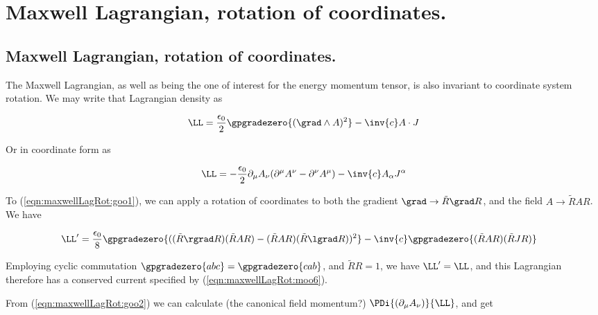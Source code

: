 %

\chapter{Maxwell Lagrangian, rotation of coordinates.}
\label{chap:maxwellLagRot}
{}
\date{Sept 5, 2009}

\beginArtNoToc

\section{Maxwell Lagrangian, rotation of coordinates.}

The Maxwell Lagrangian, as well as being the one of interest for the energy momentum tensor, is also invariant to coordinate system rotation.  We may write that Lagrangian density as

\begin{align}\label{eqn:maxwellLagRot:goo1}
\LL = \frac{\epsilon_0}{2} \gpgradezero{(\grad \wedge A)^2} - \inv{c} A \cdot J
\end{align}

Or in coordinate form as

\begin{align}\label{eqn:maxwellLagRot:goo2}
\LL = -\frac{\epsilon_0}{2} \partial_\mu A_\nu (\partial^\mu A^\nu - \partial^\nu A^\mu) - \inv{c} A_\alpha J^\alpha
\end{align}

To (\ref{eqn:maxwellLagRot:goo1}), we can apply a rotation of coordinates to both the gradient $\grad \rightarrow \tilde{R} \grad R$, and the field $A \rightarrow \tilde{R} A R$.  We have

\begin{align}\label{eqn:maxwellLagRot:goo3}
\LL' &= \frac{\epsilon_0}{8} \gpgradezero{((\tilde{R} \rgrad R) (\tilde{R} A R) - (\tilde{R} A R) (\tilde{R} \lgrad R))^2} - \inv{c} \gpgradezero{ (\tilde{R} A R) (\tilde{R} J R)}
\end{align}

Employing cyclic commutation $\gpgradezero{ a b c} = \gpgradezero{ c a b }$, and $\tilde{R} R = 1$, we have $\LL' = \LL$, and this Lagrangian therefore has a conserved current specified by (\ref{eqn:maxwellLagRot:moo6}).

From (\ref{eqn:maxwellLagRot:goo2}) we can calculate (the canonical field momentum?) $\PDi{(\partial_\mu {A}_\nu)}{\LL}$, and get

